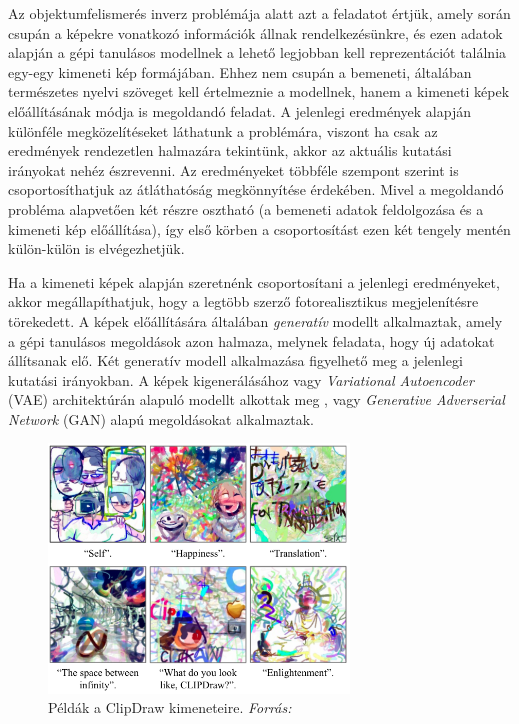 Az objektumfelismerés inverz problémája alatt azt a feladatot értjük, amely során csupán a képekre vonatkozó információk állnak rendelkezésünkre, és ezen adatok alapján a gépi tanulásos modellnek a lehető legjobban kell reprezentációt találnia egy-egy kimeneti kép formájában.
Ehhez nem csupán a bemeneti, általában természetes nyelvi szöveget kell értelmeznie a modellnek, hanem a kimeneti képek előállításának módja is megoldandó feladat.
A jelenlegi eredmények alapján különféle megközelítéseket láthatunk a problémára, viszont ha csak az eredmények rendezetlen halmazára tekintünk, akkor az aktuális kutatási irányokat nehéz észrevenni. Az eredményeket többféle szempont szerint is csoportosíthatjuk az átláthatóság megkönnyítése érdekében. Mivel a megoldandó probléma alapvetően két részre osztható (a bemeneti adatok feldolgozása és a kimeneti kép előállítása), így első körben a csoportosítást ezen két tengely mentén külön-külön is elvégezhetjük.

Ha a kimeneti képek alapján szeretnénk csoportosítani a jelenlegi eredményeket, akkor megállapíthatjuk, hogy a legtöbb szerző fotorealisztikus megjelenítésre törekedett. A képek előállítására általában \textit{generatív} modellt alkalmaztak, amely a gépi tanulásos megoldások azon halmaza, melynek feladata, hogy új adatokat állítsanak elő. Két generatív modell alkalmazása figyelhető meg a jelenlegi kutatási irányokban.
A képek kigenerálásához vagy \textit{Variational Autoencoder} (VAE) architektúrán alapuló modellt alkottak meg \cite{ramesh2021zero}, vagy \textit{Generative Adverserial Network} (GAN) alapú megoldásokat \cite{dong2021unsupervised, reed2016learning, xu2018attngan, zhang2017stackgan} alkalmaztak.

\begin{figure}[h]
	\centering
	\includegraphics[width=8cm]{images/clipdraw.png}
	\caption{Példák a ClipDraw kimeneteire. \textit{Forrás:} \cite{frans2021clipdraw}}
	\label{fig:clipdraw}
\end{figure}

